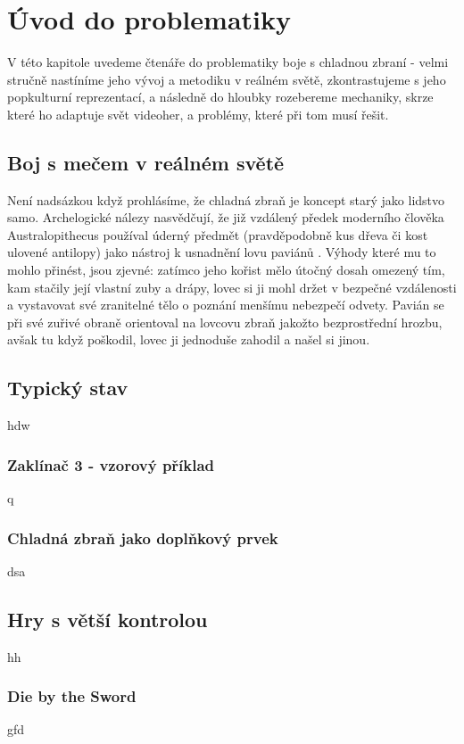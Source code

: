 \chapter{Úvod do problematiky}
V této kapitole uvedeme čtenáře do problematiky boje s chladnou zbraní - velmi stručně nastíníme jeho vývoj a metodiku v reálném světě, zkontrastujeme s jeho popkulturní reprezentací, a následně do hloubky rozebereme mechaniky, skrze které ho adaptuje svět videoher, a problémy, které při tom musí řešit.


\section{Boj s mečem v reálném světě}
Není nadsázkou když prohlásíme, že chladná zbraň je koncept starý jako lidstvo samo. Archelogické nálezy nasvědčují, že již vzdálený předek moderního člověka Australopithecus používal úderný předmět (pravděpodobně kus dřeva či kost ulovené antilopy) jako nástroj k usnadnění lovu paviánů \cite{AustralopithecusWeapon}. Výhody které mu to mohlo přinést, jsou zjevné: zatímco jeho kořist mělo útočný dosah omezený tím, kam stačily její vlastní zuby a drápy, lovec si ji mohl držet v bezpečné vzdálenosti a vystavovat své zranitelné tělo o poznání menšímu nebezpečí odvety. Pavián se při své zuřivé obraně orientoval na lovcovu zbraň jakožto bezprostřední hrozbu, avšak tu když poškodil, lovec ji jednoduše zahodil a našel si jinou. 



\section{Typický stav}
hdw

\subsection{Zaklínač 3 - vzorový příklad}
q

\subsection{Chladná zbraň jako doplňkový prvek}
dsa



\section{Hry s větší kontrolou}
hh

\subsection{Die by the Sword}
gfd

